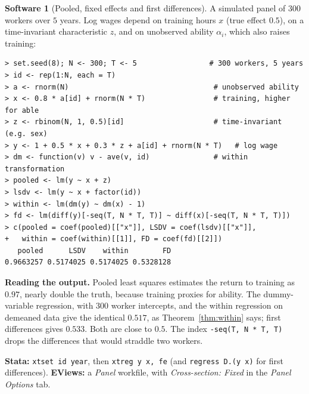 \documentclass[11pt,a4paper]{article}
\numberwithin{equation}{section}
\theoremstyle{definition}
\newtheorem{software}[thm]{Software}
\begin{document}
\begin{software}[Pooled, fixed effects and first differences]
\label{sw:panelfe}
A simulated panel of $300$ workers over $5$ years. Log wages depend on training hours $x$ (true effect $0.5$), on a time-invariant characteristic $z$, and on
unobserved ability $\alpha_i$, which also raises training:
{\small\begin{verbatim}
> set.seed(8); N <- 300; T <- 5                 # 300 workers, 5 years
> id <- rep(1:N, each = T)
> a <- rnorm(N)                                  # unobserved ability
> x <- 0.8 * a[id] + rnorm(N * T)                # training, higher for able
> z <- rbinom(N, 1, 0.5)[id]                     # time-invariant (e.g. sex)
> y <- 1 + 0.5 * x + 0.3 * z + a[id] + rnorm(N * T)   # log wage
> dm <- function(v) v - ave(v, id)               # within transformation
> pooled <- lm(y ~ x + z)
> lsdv <- lm(y ~ x + factor(id))
> within <- lm(dm(y) ~ dm(x) - 1)
> fd <- lm(diff(y)[-seq(T, N * T, T)] ~ diff(x)[-seq(T, N * T, T)])
> c(pooled = coef(pooled)[["x"]], LSDV = coef(lsdv)[["x"]],
+   within = coef(within)[[1]], FD = coef(fd)[[2]])
   pooled      LSDV    within        FD 
0.9663257 0.5174025 0.5174025 0.5328128 
\end{verbatim}}
\textbf{Reading the output.} Pooled least squares estimates the return to training as $0.97$, nearly double the truth, because training proxies for ability. The
dummy-variable regression, with $300$ worker intercepts, and the within regression on demeaned data give the identical $0.517$, as Theorem~\ref{thm:within} says;
first differences gives $0.533$. Both are close to $0.5$. The index \texttt{-seq(T, N * T, T)} drops the differences that would straddle two workers.

\textbf{Stata:} \texttt{xtset id year}, then \texttt{xtreg y x, fe} (and \texttt{regress D.(y x)} for first differences). \textbf{EViews:} a \emph{Panel} workfile, with
\emph{Cross-section: Fixed} in the \emph{Panel Options} tab.
\end{software}
\end{document}
